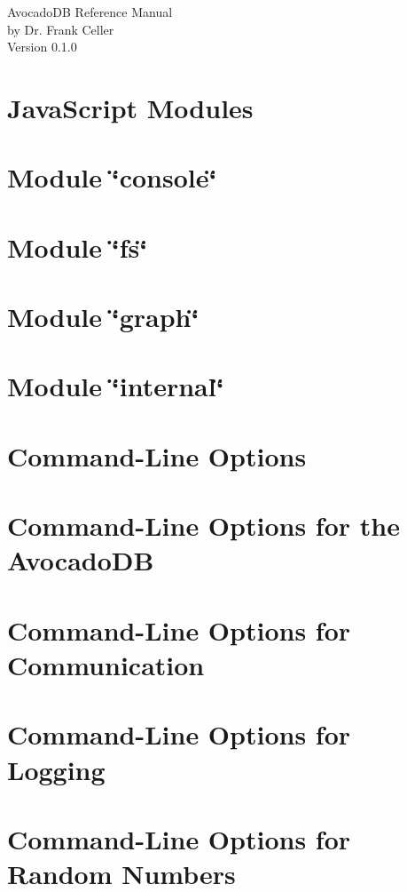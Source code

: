 \documentclass[a4paper]{book}
\begin{document}
\begin{titlepage}
\vspace*{7cm}
\begin{center}
{\Large AvocadoDB Reference Manual }\\
\vspace*{1cm}
{\large by Dr. Frank Celler}\\
\vspace*{0.5cm}
{\small Version 0.1.0}\\
\end{center}
\end{titlepage}
\clearemptydoublepage
{}
\tableofcontents
\clearemptydoublepage
{}
\chapter{JavaScript Modules}
\label{JSModules}

\chapter{Module \char`\"{}console\char`\"{}}
\label{JSModuleConsole}

\chapter{Module \char`\"{}fs\char`\"{}}
\label{JSModuleFs}

\chapter{Module \char`\"{}graph\char`\"{}}
\label{JSModuleGraph}

\chapter{Module \char`\"{}internal\char`\"{}}
\label{JSModuleInternal}

\chapter{Command-\/Line Options}
\label{CommandLine}

\chapter{Command-\/Line Options for the AvocadoDB}
\label{CommandLineAvocado}

\chapter{Command-\/Line Options for Communication}
\label{CommandLineScheduler}

\chapter{Command-\/Line Options for Logging}
\label{CommandLineLogging}

\chapter{Command-\/Line Options for Random Numbers}
\label{CommandLineRandom}

\printindex
\end{document}
